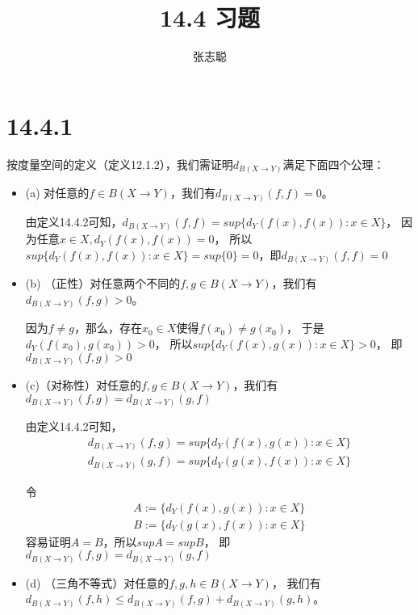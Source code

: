 \documentclass{article}
\begin{document}
\title{14.4 习题}
\author{张志聪}
\maketitle

\section*{14.4.1}

按度量空间的定义（定义12.1.2），我们需证明$d_{B(X \to Y)}$满足下面四个公理：

\begin{itemize}
  \item (a) 对任意的$f \in B(X \to Y)$，我们有$d_{B(X \to Y)}(f, f) = 0$。

        由定义14.4.2可知，$d_{B(X \to Y)}(f, f) = sup\{d_Y(f(x), f(x)): x \in X\}$，
        因为任意$x \in X, d_Y(f(x), f(x)) = 0$，
        所以$sup\{d_Y(f(x), f(x)): x \in X\} = sup\{0\} = 0$，即$d_{B(X \to Y)}(f, f) = 0$

  \item (b) （正性）对任意两个不同的$f, g \in B(X \to Y)$，我们有$d_{B(X \to Y)}(f, g) > 0$。

        因为$f \neq g$，那么，存在$x_0 \in X$使得$f(x_0) \neq g(x_0)$，
        于是$d_Y(f(x_0), g(x_0)) > 0$，
        所以$sup\{d_Y(f(x), g(x)): x \in X\} > 0$，
        即$d_{B(X \to Y)}(f, g) > 0$

  \item (c)（对称性）对任意的$f, g \in B(X \to Y)$，我们有$d_{B(X \to Y)}(f, g) = d_{B(X \to Y)}(g, f)$

        由定义14.4.2可知，
        \begin{align*}
          d_{B(X \to Y)}(f, g) = sup\{d_Y(f(x), g(x)): x \in X\} \\
          d_{B(X \to Y)}(g, f) = sup\{d_Y(g(x), f(x)): x \in X\}
        \end{align*}

        令
        \begin{align*}
          A := \{d_Y(f(x), g(x)): x \in X\} \\
          B := \{d_Y(g(x), f(x)): x \in X\}
        \end{align*}
        容易证明$A = B$，所以$sup A = sup B$，
        即$d_{B(X \to Y)}(f, g) = d_{B(X \to Y)}(g, f)$

  \item (d) （三角不等式）对任意的$f, g, h \in B(X \to Y)$，
        我们有$d_{B(X \to Y)}(f, h) \leq d_{B(X \to Y)}(f, g) + d_{B(X \to Y)}(g, h)$。


\end{itemize}
\end{document}
